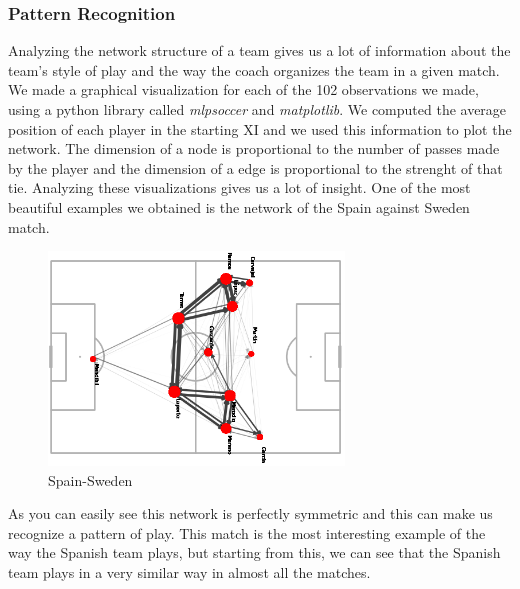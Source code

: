 \documentclass[12pt, a4paper]{article}
\begin{document}
\subsubsection{Pattern Recognition}
Analyzing the network structure of a team gives us a lot of information about the team's style of play and the way the coach organizes the team in a given match. We made a graphical visualization for each of the 102 observations we made, using a python library called \emph{mlpsoccer} and \emph{matplotlib}. We computed the average position of each player in the starting XI and we used this information to plot the network. The dimension of a node is proportional to the number of passes made by the player and the dimension of a edge is proportional to the strenght of that tie. Analyzing these visualizations gives us a lot of insight. One of the most beautiful examples we obtained is the network of the Spain against Sweden match. \\
\begin{figure}[H]
        \centering
        \includegraphics[width=0.7\textwidth]{../NoSubs/ImagesToRedo/Spain_Network_Spain_Sweden.png}
        \caption{Spain-Sweden}
        \label{fig: spain_sweden}
\end{figure}
As you can easily see this network is perfectly symmetric and this can make us recognize a pattern of play. This match is the most interesting example of the way the Spanish team plays, but starting from this, we can see that the Spanish team plays in a very similar way in almost all the matches. \\
\end{document}
